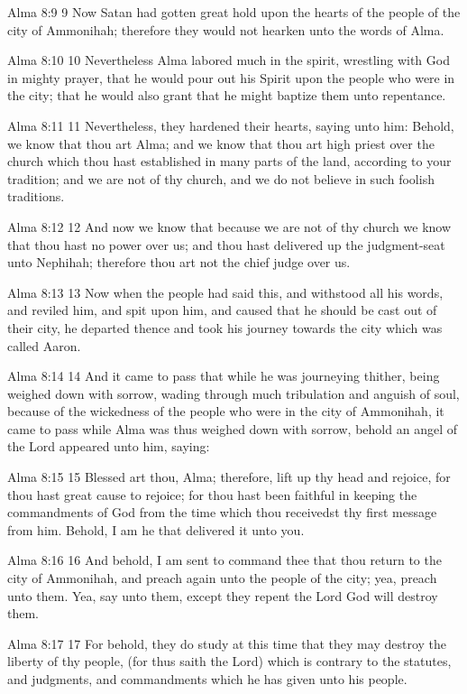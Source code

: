 Alma 8:9
 9 Now Satan had gotten great hold upon the hearts of the people
of the city of Ammonihah; therefore they would not hearken unto
the words of Alma.

Alma 8:10
 10 Nevertheless Alma labored much in the spirit, wrestling with
God in mighty prayer, that he would pour out his Spirit upon the
people who were in the city; that he would also grant that he
might baptize them unto repentance.

Alma 8:11
 11 Nevertheless, they hardened their hearts, saying unto him:
Behold, we know that thou art Alma; and we know that thou art
high priest over the church which thou hast established in many
parts of the land, according to your tradition; and we are not of
thy church, and we do not believe in such foolish traditions.

Alma 8:12
 12 And now we know that because we are not of thy church we know
that thou hast no power over us; and thou hast delivered up the
judgment-seat unto Nephihah; therefore thou art not the chief
judge over us.

Alma 8:13
 13 Now when the people had said this, and withstood all his
words, and reviled him, and spit upon him, and caused that he
should be cast out of their city, he departed thence and took his
journey towards the city which was called Aaron.

Alma 8:14
 14 And it came to pass that while he was journeying thither,
being weighed down with sorrow, wading through much tribulation
and anguish of soul, because of the wickedness of the people who
were in the city of Ammonihah, it came to pass while Alma was
thus weighed down with sorrow, behold an angel of the Lord
appeared unto him, saying:

Alma 8:15
 15 Blessed art thou, Alma; therefore, lift up thy head and
rejoice, for thou hast great cause to rejoice; for thou hast been
faithful in keeping the commandments of God from the time which
thou receivedst thy first message from him. Behold, I am he that
delivered it unto you.

Alma 8:16
 16 And behold, I am sent to command thee that thou return to the
city of Ammonihah, and preach again unto the people of the city;
yea, preach unto them. Yea, say unto them, except they repent
the Lord God will destroy them.

Alma 8:17
 17 For behold, they do study at this time that they may destroy
the liberty of thy people, (for thus saith the Lord) which is
contrary to the statutes, and judgments, and commandments which
he has given unto his people.

